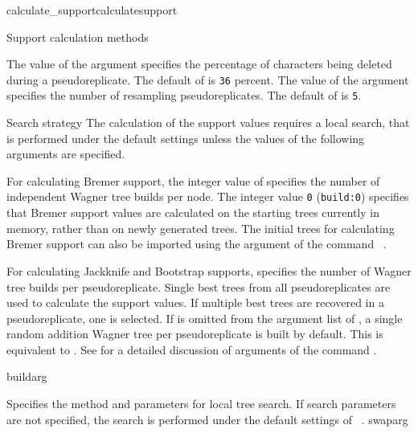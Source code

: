 \begin{command}{calculate\_support}{calculatesupport}
\begin{arguments}
\begin{argumentgroup}{Support calculation methods}
\begin{description}
{The value of the argument  specifies the
percentage of characters being deleted during a pseudoreplicate. The
default of  is \texttt{36} percent.}
{}
{The value of the argument  specifies the
number of resampling pseudoreplicates. The default of
 is \texttt{5}.}
{}
\end{description} 
\end{argumentgroup}

\begin{argumentgroup}{Search strategy}
{The calculation of the support values requires a local search,
that is performed under the default settings unless the values
of the following arguments are specified.}

{For calculating Bremer support, the integer value of
 specifies the number of independent
Wagner tree builds per node. The integer value \texttt{0}
(\texttt{build:0}) specifies that Bremer support values are
calculated on the starting trees currently
in memory, rather than on newly generated trees.
The initial trees for calculating Bremer support
can also be imported using the argument 
of the command ~.

\setlength{\parindent}{0.5cm}                
\indent 
For calculating Jackknife and Bootstrap supports, 
 specifies the number of
Wagner tree builds per pseudoreplicate. Single best trees from all
pseudoreplicates are used to calculate the support values. If
multiple best trees are recovered in a pseudoreplicate, one 
is selected. If  is
omitted from the argument list of ,
a single random addition Wagner tree per
pseudoreplicate is built by default. This is equivalent to 
. See
 for a detailed discussion of
arguments of the command .}
{buildarg}

{Specifies the method and parameters for local tree search. If search
parameters are not specified, the search is performed under
the default settings of ~.} 
{swaparg}

\end{argumentgroup}


\end{arguments}
\end{command}

